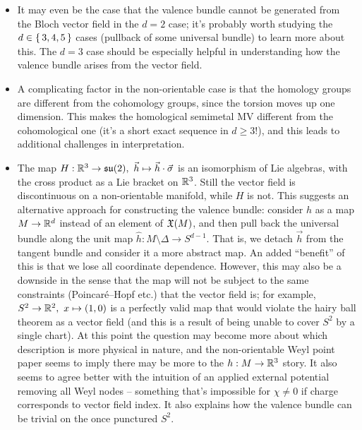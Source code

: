 {\begin{itemize}
	\item It may even be the case that the valence bundle cannot be generated from the Bloch vector field in the $d=2$ case; it's probably worth studying the $d\in\set{3,4,5}$ cases (pullback of some universal bundle) to learn more about this. The $d=3$ case should be especially helpful in understanding how the valence bundle arises from the vector field.
	
	\item A complicating factor in the non-orientable case is that the homology groups are different from the cohomology groups, since the torsion moves up one dimension. This makes the homological semimetal MV different from the cohomological one (it's a short exact sequence in $d\geq3$!), and this leads to additional challenges in interpretation.
	
	\item The map $H: \R^3\to\la[su](2),\ \vec{h}\mapsto \vec{h}\cdot\vec{\sigma}$ is an isomorphism of Lie algebras, with the cross product as a Lie bracket on $\mathbb{R}^3$. Still the vector field is discontinuous on a non-orientable manifold, while $H$ is not. This suggests an alternative approach for constructing the valence bundle: consider $h$ as a map $M\to\mathbb{R}^d$ instead of an element of $\mathfrak{X}(M)$, and then pull back the universal bundle along the unit map $\hat{h}:M\setminus\Delta\to S^{d-1}$. That is, we detach $\vec{h}$ from the tangent bundle and consider it a more abstract map. An added ``benefit'' of this is that we lose all coordinate dependence. However, this may also be a downside in the sense that the map will not be subject to the same constraints (Poincaré--Hopf etc.) that the vector field is; for example, $S^2\to\R^2,\ x\mapsto(1,0)$ is a perfectly valid map that would violate the hairy ball theorem as a vector field (and this is a result of being unable to cover $S^2$ by a single chart). At this point the question may become more about which description is more physical in nature, and the non-orientable Weyl point paper\cite{Foncesca-Vaidya_nonorientable} seems to imply there may be more to the $h:M\to\mathbb{R}^3$ story. It also seems to agree better with the intuition of an applied external potential removing all Weyl nodes -- something that's impossible for $\chi\neq0$ if charge corresponds to vector field index. It also explains how the valence bundle can be trivial on the once punctured $S^2$.
	

\end{itemize}}
